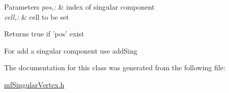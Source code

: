 \begin{DoxyParams}{Parameters}
{\em pos,:} & index of singular component \\
\hline
{\em cell,:} & cell to be set \\
\hline
\end{DoxyParams}
\begin{DoxyReturn}{Returns}
true if 'pos' exist
\end{DoxyReturn}
For add a singular component use addSing 

The documentation for this class was generated from the following file:\begin{DoxyCompactItemize}
\item 
\hyperlink{mfSingularVertex_8h}{mfSingularVertex.h}\end{DoxyCompactItemize}

